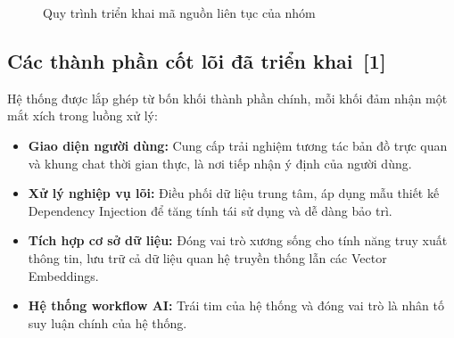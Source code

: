 \documentclass[12pt, a4paper]{article}
\begin{document}
\begin{figure}[H]
    \centering
    \caption{Quy trình triển khai mã nguồn liên tục của nhóm}
    \label{fig:impl_workflow}
\end{figure}

\subsection[Các thành phần cốt lõi đã triển khai]{Các thành phần cốt lõi đã triển khai \,{\normalfont\small\textcolor{cyan!70!black}{[1]}}}
Hệ thống được lắp ghép từ bốn khối thành phần chính, mỗi khối đảm nhận một mắt xích trong luồng xử lý:
\begin{itemize}
    \item \textbf{Giao diện người dùng:} Cung cấp trải nghiệm tương tác bản đồ trực quan và khung chat thời gian thực, là nơi tiếp nhận ý định của người dùng.
    \item \textbf{Xử lý nghiệp vụ lõi:} Điều phối dữ liệu trung tâm, áp dụng mẫu thiết kế Dependency Injection để tăng tính tái sử dụng và dễ dàng bảo trì.
    \item \textbf{Tích hợp cơ sở dữ liệu:} Đóng vai trò xương sống cho tính năng truy xuất thông tin, lưu trữ cả dữ liệu quan hệ truyền thống lẫn các Vector Embeddings.
    \item \textbf{Hệ thống workflow AI:} Trái tim của hệ thống và đóng vai trò là nhân tố suy luận chính của hệ thống.
\end{itemize}
\end{document}
